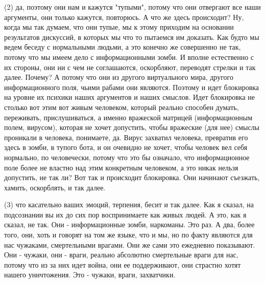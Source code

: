 (2) да, поэтому они нам и кажутся "тупыми", потому что они отвергают все наши
аргументы, они только кажутся, повторюсь. А что же здесь происходит? Ну, когда
мы так думаем, что они тупые, мы к этому приходим на основании результатов
дискуссий, в которых мы что то пытаемся им доказать. Как будто мы ведем беседу
с нормальными людьми, а это конечно же совершенно не так, потому что мы имеем
дело с информационными зомби. И вполне естественно с их стороны, они ни с чем
не соглашаются, оскорбляют, переводят стрелки и так далее. Почему? А потому что
они из другого виртуального мира, другого информационного поля, чьими рабами
они являются. Поэтому и идет блокировка на уровне их психики наших аргументов и
наших смыслов. Идет блокировка не столько вот этим вот живым человеком, который
реально способен думать, переживать, прислушиваться, а именно вражеской
матрицей (информационным полем, вирусом), которая не хочет допустить, чтобы
вражеские (для нее) смыслы проникали в человека, понимаете, да. Вирус захватил
человека, превратив его здесь в зомби, в тупого бота, и он очевидно не хочет,
чтобы человек вел себя нормально, по человечески, потому что это бы означало,
что информационное поле более не властно над этим конкретным человеком, а это
никак нельзя допустить, не так ли? Вот так и происходит блокировка. Они
начинают съезжать, хамить, оскорблять, и так далее.

(3) что касательно ваших эмоций, терпения, бесит и так далее. Как я сказал, на
подсознании вы их до сих пор воспринимаете как живых людей. А это, как я
сказал, не так. Они - информационные зомби, наркоманы. Это раз. А два, более
того, они, хоть и говорят на том же языке, что и мы, но по факту являются для
нас чужаками, смертельными врагами. Они же сами это ежедневно показывают. Они -
чужаки, они - враги, реально абсолютно смертельные враги для нас, потому что из
за них идет война, они ее поддерживают, они страстно хотят нашего уничтожения.
Это - чужаки, враги, захватчики.





